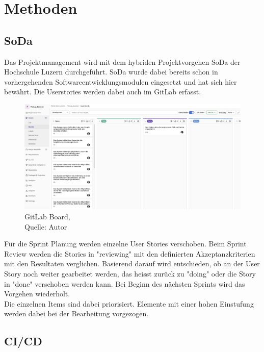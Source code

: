 \section{Methoden}
\subsection{\gls{SoDa}}
Das Projektmanagement wird mit dem hybriden Projektvorgehen \gls{SoDa} der Hochschule Luzern durchgeführt. 
SoDa wurde dabei bereits schon in vorhergehenden Softwareentwicklungsmodulen eingesetzt und hat sich hier bewährt. Die Userstories werden dabei auch im \gls{GitLab} erfasst.  
\begin{figure}[H]
	\centering
	\includegraphics[width=1\textwidth]{images/boardGitlab.png}
	\caption[GitLab Board]{GitLab Board,\\ Quelle: Autor}
	\label{img: GitlLabBoard}
\end{figure}
Für die Sprint Planung werden einzelne User Stories verschoben. Beim Sprint Review werden die Stories in "reviewing" mit den definierten Akzeptanzkriterien mit den Resultaten verglichen. Basierend darauf wird entschieden, ob an der \gls{User Story} noch weiter gearbeitet werden, das heisst zurück zu "doing" oder die Story in "done" verschoben werden kann. Bei Beginn des nächsten Sprints wird das Vorgehen wiederholt. \\
Die einzelnen Items sind dabei priorisiert. Elemente mit einer hohen Einstufung werden dabei bei der Bearbeitung vorgezogen. 

\subsection{CI/CD}



\newpage